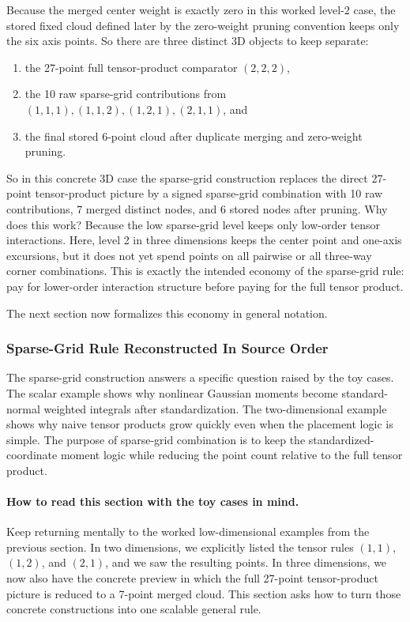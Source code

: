 \documentclass[11pt]{article}
\numberwithin{equation}{section}
\begin{document}
Because the merged center weight is exactly zero in this worked level-2 case,
the stored fixed cloud defined later by the zero-weight pruning convention keeps
only the six axis points.  So there are three distinct 3D objects to keep
separate:
\begin{enumerate}[leftmargin=0.28in]
  \item the 27-point full tensor-product comparator \((2,2,2)\),
  \item the 10 raw sparse-grid contributions from
  \((1,1,1),(1,1,2),(1,2,1),(2,1,1)\), and
  \item the final stored 6-point cloud after duplicate merging and zero-weight
  pruning.
\end{enumerate}
So in this concrete 3D case the sparse-grid construction replaces the direct
27-point tensor-product picture by a signed sparse-grid combination with 10 raw
contributions, 7 merged distinct nodes, and 6 stored nodes after pruning.  Why
does this work?
Because the low sparse-grid level keeps only low-order tensor interactions.
Here, level 2 in three dimensions keeps the center point and one-axis excursions,
but it does not yet spend points on all pairwise or all three-way corner
combinations.  This is exactly the intended economy of the sparse-grid rule: pay
for lower-order interaction structure before paying for the full tensor product.

The next section now formalizes this economy in general notation.

\subsubsection{Sparse-Grid Rule Reconstructed In Source Order}
\label{sec:p31-sgq-reconstruction}

The sparse-grid construction answers a specific question raised by the toy cases.
The scalar example shows why nonlinear Gaussian moments become standard-normal
weighted integrals after standardization.  The two-dimensional example shows why
naive tensor products grow quickly even when the placement logic is simple.  The
purpose of sparse-grid combination is to keep the standardized-coordinate moment
logic while reducing the point count relative to the full tensor product.

\paragraph{How to read this section with the toy cases in mind.}
Keep returning mentally to the worked low-dimensional examples from the previous
section.  In two dimensions, we explicitly listed the tensor rules
\((1,1)\), \((1,2)\), and \((2,1)\), and we saw the resulting points.  In three
dimensions, we now also have the concrete preview in which the full 27-point
tensor-product picture is reduced to a 7-point merged cloud.  This section asks
how to turn those concrete constructions into one scalable general rule.
\end{document}
